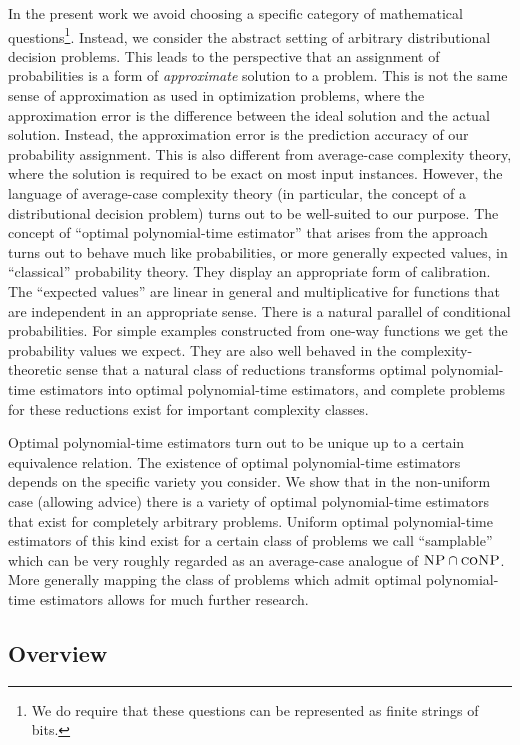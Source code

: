 \documentclass[11pt]{article}
\numberwithin{equation}{section}
\theoremstyle{definition}
\theoremstyle{plain}
\begin{document}
In the present work we avoid choosing a specific category of mathematical questions\footnote{We do require that these questions can be represented as finite strings of bits.}. Instead, we consider the abstract setting of arbitrary distributional decision problems. This leads to the perspective that an assignment of probabilities is a form of \emph{approximate} solution to a problem. This is not the same sense of approximation as used in optimization problems, where the approximation error is the difference between the ideal solution and the actual solution. Instead, the approximation error is the prediction accuracy of our probability assignment. This is also different from average-case complexity theory, where the solution is required to be exact on most input instances. However, the language of average-case complexity theory (in particular, the concept of a distributional decision problem) turns out to be well-suited to our purpose.
The concept of \enquote{optimal polynomial-time estimator} that arises from the approach turns out to behave much like probabilities, or more generally expected values, in \enquote{classical} probability theory. They display an appropriate form of calibration. The \enquote{expected values} are linear in general and multiplicative for functions that are independent in an appropriate sense. There is a natural parallel of conditional probabilities. For simple examples constructed from one-way functions we get the probability values we expect. They are also well behaved in the complexity-theoretic sense that a natural class of reductions transforms optimal polynomial-time estimators into optimal polynomial-time estimators, and complete problems for these reductions exist for important complexity classes.

Optimal polynomial-time estimators turn out to be unique up to a certain equivalence relation. The existence of optimal polynomial-time estimators depends on the specific variety you consider. We show that in the non-uniform case (allowing advice) there is a variety of optimal polynomial-time estimators that exist for completely arbitrary problems. Uniform optimal polynomial-time estimators of this kind exist for a certain class of problems we call \enquote{samplable} which can be very roughly regarded as an average-case analogue of $\textsc{NP} \cap \textsc{coNP}$. More generally mapping the class of problems which admit optimal polynomial-time estimators allows for much further research.

\subsection{Overview}
\end{document}
